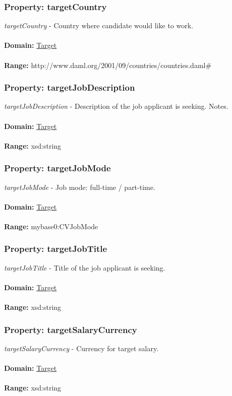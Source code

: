 \documentclass[a4paper,12pt]{article}
\numberwithin{equation}{section}
\begin{document}
\subsubsection{Property: targetCountry}\hypertarget{targetCountry}{}
\textit{targetCountry} - Country where candidate would like to work.
\\\\
\textbf{Domain:} \hyperlink{Target}{Target} 
\\\\
\textbf{Range:}  http://www.daml.org/2001/09/countries/countries.daml\#

\subsubsection{Property: targetJobDescription}\hypertarget{targetJobDescription}{}
\textit{targetJobDescription} - Description of the job applicant is seeking. Notes.
\\\\
\textbf{Domain:} \hyperlink{Target}{Target} 
\\\\
\textbf{Range:}  xsd:string

\subsubsection{Property: targetJobMode}\hypertarget{targetJobMode}{}
\textit{targetJobMode} - Job mode: full-time / part-time.
\\\\
\textbf{Domain:} \hyperlink{Target}{Target} 
\\\\
\textbf{Range:}  mybase0:CVJobMode

\subsubsection{Property: targetJobTitle}\hypertarget{targetJobTitle}{}
\textit{targetJobTitle} - Title of the job applicant is seeking.
\\\\
\textbf{Domain:} \hyperlink{Target}{Target} 
\\\\
\textbf{Range:}  xsd:string

\subsubsection{Property: targetSalaryCurrency}\hypertarget{targetSalaryCurrency}{}
\textit{targetSalaryCurrency} - Currency for target salary.
\\\\
\textbf{Domain:} \hyperlink{Target}{Target} 
\\\\
\textbf{Range:}  xsd:string
\end{document}
